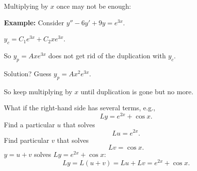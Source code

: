 \documentclass[10pt,aspectratio=169]{beamer}
\begin{document}
\begin{frame}
Multiplying by $x$ once may not be enough:

\medskip

\textbf{Example:}
Consider
\quad
$y''-6y'+9y = e^{3x}$.

\medskip
\pause

\quad $y_c = C_1 e^{3x} + C_2 x e^{3x}$.

\medskip
\pause

So $y_p = A xe^{3x}$ does not get rid of the duplication with $y_c$.

\medskip
\pause

Solution? \pause Guess \quad $y_p = Ax^2e^{3x}$.

\pause
\medskip
So keep multiplying by $x$ until duplication is gone but no more.
\end{frame}

\begin{frame}
What if the right-hand side has several terms, e.g.,
\[
Ly = e^{2x} + \cos x .
\]
\pause
Find a particular $u$ that solves
\[
Lu = e^{2x} .
\]
\pause
Find particular $v$ that solves
\[
Lv = \cos x .
\]
\pause
$y=u+v$ \quad solves \quad
$Ly = e^{2x} + \cos x$:
\[
Ly=L(u+v) = Lu+Lv = e^{2x} + \cos x .
\]
\end{frame}
\end{document}
